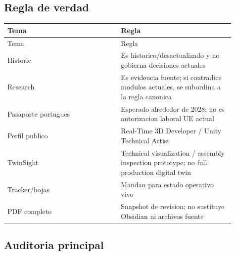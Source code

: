 \subsection{Regla de verdad}


\begin{center}
\scriptsize
\begin{longtable}{>{\raggedright\arraybackslash}p{0.455\linewidth} >{\raggedright\arraybackslash}p{0.455\linewidth}}
\toprule
Tema & Regla \\
\midrule
\endfirsthead
\toprule
Tema & Regla \\
\midrule
\endhead
Historic & Es historico/desactualizado y no gobierna decisiones actuales \\
Research & Es evidencia fuente; si contradice modulos actuales, se subordina a la regla canonica \\
Pasaporte portugues & Esperado alrededor de 2028; no es autorizacion laboral UE actual \\
Perfil publico & Real-Time 3D Developer / Unity Technical Artist \\
TwinSight & Technical visualization / assembly inspection prototype; no full production digital twin \\
Tracker/hojas & Mandan para estado operativo vivo \\
PDF completo & Snapshot de revision; no sustituye Obsidian ni archivos fuente \\
\bottomrule
\end{longtable}
\end{center}


\subsection{Auditoria principal}


